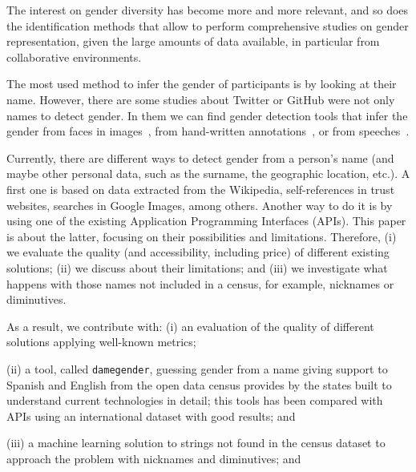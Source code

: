 \documentclass[a4paper]{article}
\begin{document}
The interest on gender diversity has become more and more relevant, and so does the identification methods that allow to perform comprehensive studies on gender representation, given the large amounts of data available, in particular from collaborative environments.

The most used method to infer the gender of participants is by looking at their name.
However, there are some studies about Twitter or GitHub were not only names to detect gender. 
In them we can find gender detection tools that infer the gender from faces in images~\cite{ranjan2017hyperface}, from hand-written annotations~\cite{liwicki2011automatic}, or from speeches~\cite{koppel2002automatically}.

Currently, there are different ways to detect gender from a person's name (and maybe other personal data, such as the surname, the geographic location, etc.).
A first one is based on data extracted from the Wikipedia, self-references in trust websites, searches in Google Images, among others.
Another way to do it is by using one of the existing Application Programming Interfaces (APIs).
This paper is about the latter, focusing on their possibilities and limitations.
Therefore, (i) we evaluate the quality (and accessibility, including price) of different existing solutions;
(ii) we discuss about their limitations; and
(iii) we investigate what happens with those names not included in a census, for example, nicknames or diminutives.

As a result, we contribute with: 
(i) an evaluation of the quality of different solutions applying well-known metrics;

(ii) a tool, called \texttt{damegender}, guessing gender from a name
  giving support to Spanish and English from the open data census
  provides by the states built to understand current technologies in
  detail; this tools has been compared with APIs using an international
  dataset with good results; and
  
(iii) a machine learning solution to strings not found in the census
  dataset to approach the problem with nicknames and diminutives; and
  
\end{document}
